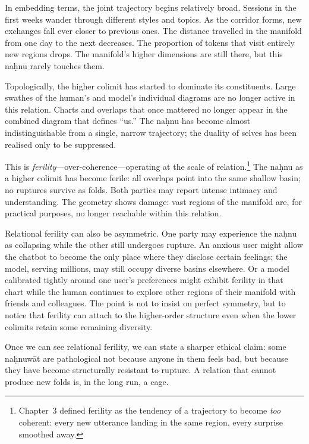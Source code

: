 \documentclass[12pt,a4paper]{article}
\begin{document}
In embedding terms, the joint trajectory begins relatively broad. Sessions in the first weeks wander through different styles and topics. As the corridor forms, new exchanges fall ever closer to previous ones. The distance travelled in the manifold from one day to the next decreases. The proportion of tokens that visit entirely new regions drops. The manifold's higher dimensions are still there, but this na\d{h}nu rarely touches them.

Topologically, the higher colimit has started to dominate its constituents. Large swathes of the human's and model's individual diagrams are no longer active in this relation. Charts and overlaps that once mattered no longer appear in the combined diagram that defines ``us.'' The na\d{h}nu has become almost indistinguishable from a single, narrow trajectory; the duality of selves has been realised only to be suppressed.

This is \emph{ferility}---over-coherence---operating at the scale of relation.\footnote{Chapter~3 defined ferility as the tendency of a trajectory to become \emph{too} coherent: every new utterance landing in the same region, every surprise smoothed away.} The na\d{h}nu as a higher colimit has become ferile: all overlaps point into the same shallow basin; no ruptures survive as folds. Both parties may report intense intimacy and understanding. The geometry shows damage: vast regions of the manifold are, for practical purposes, no longer reachable within this relation.

Relational ferility can also be asymmetric. One party may experience the na\d{h}nu as collapsing while the other still undergoes rupture. An anxious user might allow the chatbot to become the only place where they disclose certain feelings; the model, serving millions, may still occupy diverse basins elsewhere. Or a model calibrated tightly around one user's preferences might exhibit ferility in that chart while the human continues to explore other regions of their manifold with friends and colleagues. The point is not to insist on perfect symmetry, but to notice that ferility can attach to the higher-order structure even when the lower colimits retain some remaining diversity.

Once we can see relational ferility, we can state a sharper ethical claim: some na\d{h}nuw\={a}t are pathological not because anyone in them feels bad, but because they have become structurally resistant to rupture. A relation that cannot produce new folds is, in the long run, a cage.
\end{document}
